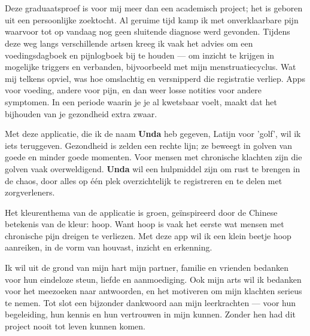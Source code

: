 
\chapter*{}%
\label{ch:voorwoord}

Deze graduaatsproef is voor mij meer dan een academisch project; het is geboren uit een persoonlijke zoektocht. Al geruime tijd kamp ik met onverklaarbare pijn waarvoor tot op vandaag nog geen sluitende diagnose werd gevonden. Tijdens deze weg langs verschillende artsen kreeg ik vaak het advies om een voedingsdagboek en pijnlogboek bij te houden — om inzicht te krijgen in mogelijke triggers en verbanden, bijvoorbeeld met mijn menstruatiecyclus. Wat mij telkens opviel, was hoe omslachtig en versnipperd die registratie verliep. Apps voor voeding, andere voor pijn, en dan weer losse notities voor andere symptomen. In een periode waarin je je al kwetsbaar voelt, maakt dat het bijhouden van je gezondheid extra zwaar.

Met deze applicatie, die ik de naam \textbf{Unda} heb gegeven, Latijn voor 'golf', wil ik iets teruggeven. Gezondheid is zelden een rechte lijn; ze beweegt in golven van goede en minder goede momenten. Voor mensen met chronische klachten zijn die golven vaak overweldigend. \textbf{Unda} wil een hulpmiddel zijn om rust te brengen in de chaos, door alles op één plek overzichtelijk te registreren en te delen met zorgverleners.

Het kleurenthema van de applicatie is groen, geïnspireerd door de Chinese betekenis van de kleur: hoop. Want hoop is vaak het eerste wat mensen met chronische pijn dreigen te verliezen. Met deze app wil ik een klein beetje hoop aanreiken, in de vorm van houvast, inzicht en erkenning.

Ik wil uit de grond van mijn hart mijn partner, familie en vrienden bedanken voor hun eindeloze steun, liefde en aanmoediging. Ook mijn arts wil ik bedanken voor het meezoeken naar antwoorden, en het motiveren om mijn klachten serieus te nemen. Tot slot een bijzonder dankwoord aan mijn leerkrachten — voor hun begeleiding, hun kennis en hun vertrouwen in mijn kunnen. Zonder hen had dit project nooit tot leven kunnen komen.

